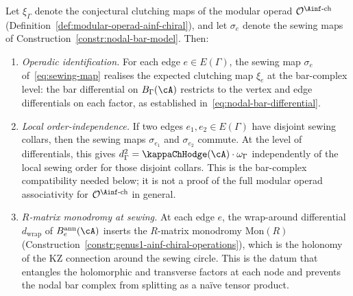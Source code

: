 \begin{proposition}%
\label{prop:nodal-bar-modular-operad}%
\label{rem:nodal-bar-modular-operad}%
%
%
Let $\xi_\Gamma$ denote the conjectural clutching maps of the modular
operad $\mathcal{O}^{\Ainf\text{-ch}}$
\textup{(}Definition~\textup{\ref{def:modular-operad-ainf-chiral}}\textup{)},
and let $\sigma_e$ denote the sewing maps of
Construction~\textup{\ref{constr:nodal-bar-model}}. Then:
\begin{enumerate}[label=\textup{(\alph*)}]
\item \emph{Operadic identification.}
 For each edge $e\in E(\Gamma)$, the sewing map $\sigma_e$
 of~\eqref{eq:sewing-map} realises the expected clutching map
 $\xi_e$ at the bar-complex level: the bar differential on
 $B_\Gamma(\cA)$ restricts to the vertex and edge
 differentials on each factor,
 as established in~\eqref{eq:nodal-bar-differential}.

\item \emph{Local order-independence.}
 If two edges $e_1,e_2\in E(\Gamma)$ have disjoint sewing
 collars, then the sewing maps $\sigma_{e_1}$ and
 $\sigma_{e_2}$ commute. At the level of differentials, this gives
 $d_\Gamma^2 = \kappaChHodge(\cA)\cdot\omega_\Gamma$ independently of the
 local sewing order for those disjoint collars. This is the
 bar-complex compatibility needed below; it is not a proof of the
 full modular operad associativity for
 $\mathcal{O}^{\Ainf\text{-ch}}$ in general.

\item \emph{$R$-matrix monodromy at sewing.}
 At each edge $e$, the wrap-around differential
 $d_{\mathrm{wrap}}$ of $B^{\mathrm{ann}}_e(\cA)$ inserts
 the $R$-matrix monodromy $\mathrm{Mon}(R)$
 \textup{(}Construction~\textup{\ref{constr:genus1-ainf-chiral-operations}}\textup{)},
 which is the holonomy of the KZ connection around the
 sewing circle. This is the datum that entangles the
 holomorphic and transverse factors at each node and
 prevents the nodal bar complex from splitting as a
 na\"ive tensor product.
\end{enumerate}
\end{proposition}


